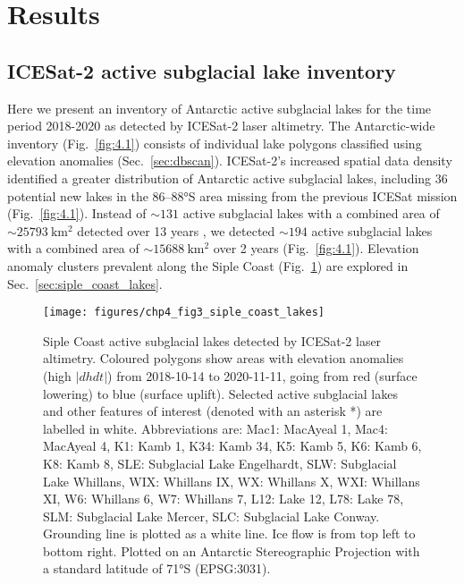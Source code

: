 \clearpage
\section{Results}

\subsection{ICESat-2 active subglacial lake inventory}

Here we present an inventory of Antarctic active subglacial lakes for the time period 2018-2020 as detected by ICESat-2 laser altimetry.
The Antarctic-wide inventory (Fig.~\ref{fig:4.1}) consists of individual lake polygons classified using elevation anomalies (Sec.~\ref{sec:dbscan}).
ICESat-2's increased spatial data density identified a greater distribution of Antarctic active subglacial lakes, including 36 potential new lakes in the 86–88°S area missing from the previous ICESat mission (Fig.~\ref{fig:4.1}).
Instead of $\sim131$ active subglacial lakes with a combined area of $\sim\SI{25793}{\kilo\metre\squared}$ detected over 13 years \citep{SiegfriedThirteenyearssubglacial2018}, we detected $\sim194$ active subglacial lakes with a combined area of $\sim\SI{15688}{\kilo\metre\squared}$ over 2 years (Fig.~\ref{fig:4.1}). %
Elevation anomaly clusters prevalent along the Siple Coast (Fig.~\ref{fig:4.3}) are explored in Sec.~\ref{sec:siple_coast_lakes}.

\begin{figure}[htbp]
  \texttt{[image: figures/chp4\_fig3\_siple\_coast\_lakes]}
  \caption[Siple Coast active subglacial lakes detected by ICESat-2 laser altimetry]{
    Siple Coast active subglacial lakes detected by ICESat-2 laser altimetry.
    Coloured polygons show areas with elevation anomalies (high $|dhdt|$) from 2018-10-14 to 2020-11-11, going from red (surface lowering) to blue (surface uplift).
    Selected active subglacial lakes and other features of interest (denoted with an asterisk *) are labelled in white.
    Abbreviations are: Mac1: MacAyeal 1, Mac4: MacAyeal 4, K1: Kamb 1, K34: Kamb 34, K5: Kamb 5, K6: Kamb 6, K8: Kamb 8, SLE: Subglacial Lake Engelhardt, SLW: Subglacial Lake Whillans, WIX: Whillans IX, WX: Whillans X, WXI: Whillans XI, W6: Whillans 6, W7: Whillans 7, L12: Lake 12, L78: Lake 78, SLM: Subglacial Lake Mercer, SLC: Subglacial Lake Conway.
    Grounding line \citep{DepoorterAntarcticmasksiceshelves2013} is plotted as a white line.
    Ice flow is from top left to bottom right.
    Plotted on an Antarctic Stereographic Projection with a standard latitude of 71°S (EPSG:3031).
  }
  \label{fig:4.3}
\end{figure}

